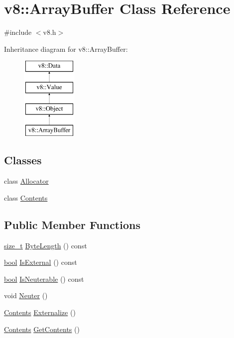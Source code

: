 \hypertarget{classv8_1_1ArrayBuffer}{}\section{v8\+:\+:Array\+Buffer Class Reference}
\label{classv8_1_1ArrayBuffer}


{\ttfamily \#include $<$v8.\+h$>$}

Inheritance diagram for v8\+:\+:Array\+Buffer\+:\begin{figure}[H]
\begin{center}
\leavevmode
\includegraphics[height=4.000000cm]{classv8_1_1ArrayBuffer}
\end{center}
\end{figure}
\subsection*{Classes}
\begin{DoxyCompactItemize}
\item 
class \mbox{\hyperlink{classv8_1_1ArrayBuffer_1_1Allocator}{Allocator}}
\item 
class \mbox{\hyperlink{classv8_1_1ArrayBuffer_1_1Contents}{Contents}}
\end{DoxyCompactItemize}
\subsection*{Public Member Functions}
\begin{DoxyCompactItemize}
\item 
\mbox{\hyperlink{classsize__t}{size\+\_\+t}} \mbox{\hyperlink{classv8_1_1ArrayBuffer_af4c4ad8075f74892ed3fa217219a2626}{Byte\+Length}} () const
\item 
\mbox{\hyperlink{classbool}{bool}} \mbox{\hyperlink{classv8_1_1ArrayBuffer_a22ecea76af2257b12bdb69b40d9bec8f}{Is\+External}} () const
\item 
\mbox{\hyperlink{classbool}{bool}} \mbox{\hyperlink{classv8_1_1ArrayBuffer_a5de3f4c29744bd89204462f987ecb626}{Is\+Neuterable}} () const
\item 
void \mbox{\hyperlink{classv8_1_1ArrayBuffer_a3420f7d38a8fe20e8f40fb82e6acb325}{Neuter}} ()
\item 
\mbox{\hyperlink{classv8_1_1ArrayBuffer_1_1Contents}{Contents}} \mbox{\hyperlink{classv8_1_1ArrayBuffer_a166848a34653afd4502e4cc33443815d}{Externalize}} ()
\item 
\mbox{\hyperlink{classv8_1_1ArrayBuffer_1_1Contents}{Contents}} \mbox{\hyperlink{classv8_1_1ArrayBuffer_acd2e6bfb9068ba3a692162f312c47154}{Get\+Contents}} ()
\end{DoxyCompactItemize}
